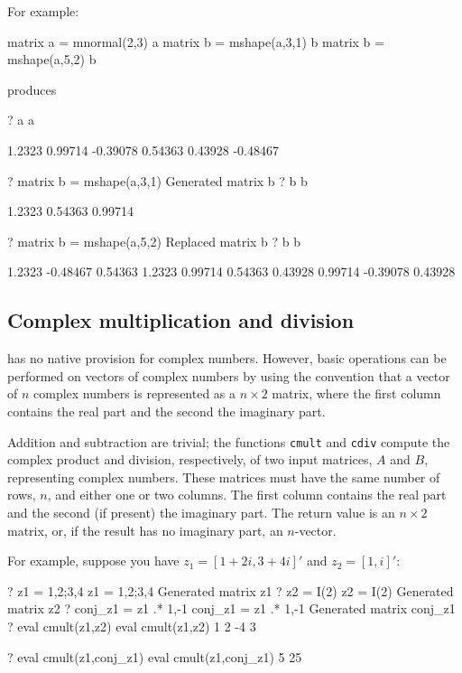 For example:
\begin{code}
matrix a = mnormal(2,3)
a
matrix b = mshape(a,3,1)
b
matrix b = mshape(a,5,2)
b
\end{code}
produces
\begin{code}
?   a
a

      1.2323      0.99714     -0.39078
     0.54363      0.43928     -0.48467

?   matrix b = mshape(a,3,1)
Generated matrix b
?   b
b

      1.2323
     0.54363
     0.99714

?   matrix b = mshape(a,5,2)
Replaced matrix b
?   b
b

      1.2323     -0.48467
     0.54363       1.2323
     0.99714      0.54363
     0.43928      0.99714
    -0.39078      0.43928
\end{code}

\subsection{Complex multiplication and division}
\label{sec:complex}

 has no native provision for complex numbers. However,
basic operations can be performed on vectors of complex numbers by
using the convention that a vector of $n$ complex numbers is
represented as a $n \times 2$ matrix, where the first column contains
the real part and the second the imaginary part.

Addition and subtraction are trivial; the functions \texttt{cmult}
and \texttt{cdiv} compute the complex product and division,
respectively, of two input matrices, $A$ and $B$, representing complex
numbers.  These matrices must have the same number of rows, $n$, and
either one or two columns.  The first column contains the real part
and the second (if present) the imaginary part.  The return value is
an $n \times 2$ matrix, or, if the result has no imaginary part, an
$n$-vector.

For example, suppose you have $z_1 = [ 1 + 2i , 3 + 4i ]'$ and $z_2 =
[ 1, i ]'$:

\begin{code}
? z1 = {1,2;3,4}
 z1 = {1,2;3,4}
Generated matrix z1
? z2 = I(2)
 z2 = I(2)
Generated matrix z2
? conj_z1 = z1 .* {1,-1}
 conj_z1 = z1 .* {1,-1}
Generated matrix conj_z1
? eval cmult(z1,z2)
 eval cmult(z1,z2)
   1    2 
  -4    3 

? eval cmult(z1,conj_z1)
 eval cmult(z1,conj_z1)
   5 
  25 
\end{code}

